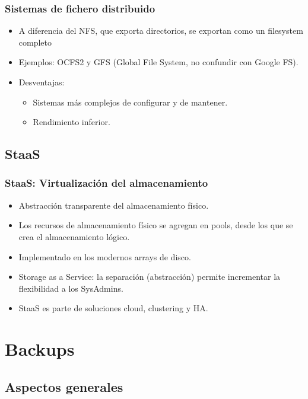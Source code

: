 \documentclass{beamer}
\begin{document}
\begin{frame}
  \frametitle{Sistemas de fichero distribuido}

  \begin{itemize}

    \item A diferencia del NFS, que exporta directorios, se exportan como un filesystem completo 
    \item Ejemplos: OCFS2 y GFS (Global File System, no confundir con Google FS).

    \item Desventajas:

  \begin{itemize}
	\item Sistemas más complejos de configurar y de mantener.
	\item Rendimiento inferior.
  \end{itemize}

  \end{itemize}
\end{frame}


\subsection{StaaS}
\begin{frame}
  \frametitle{StaaS: Virtualización del almacenamiento}
  \begin{itemize}
    \item Abstracción transparente del almacenamiento físico.
    \item Los recursos de almacenamiento físico se agregan en \alert{pools}, desde los que se crea el almacenamiento lógico.
    \item Implementado en los modernos arrays de disco.
    \item \alert{Storage as a Service}: la separación (abstracción) permite incrementar la flexibilidad a los SysAdmins. 
    \item StaaS es parte de soluciones \alert{cloud}, \alert{clustering} y \alert{HA}.
  \end{itemize}
\end{frame}



\section{Backups}

\subsection{Aspectos generales}
\end{document}
